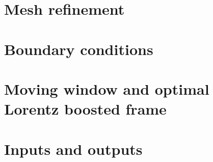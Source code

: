 \documentclass[]{report}
\begin{document}
\section{Mesh refinement}


\section{Boundary conditions}


\section{Moving window and optimal Lorentz boosted frame}


\section{Inputs and outputs}

\end{document}
